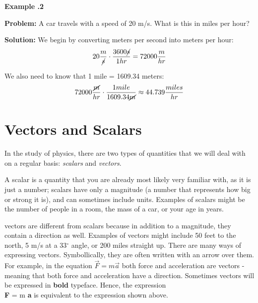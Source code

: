 	
\begin{mdframed}[backgroundcolor=blue!10!white]
	\begin{center}
		\textbf{Example \thesubsection.2}	\label{ex1132}
	\end{center}
	
	\vspace{0.1in}	
	\textbf{Problem:} A car travels with a speed of 20 m/s.  What is this in miles per hour? 
	\vspace{0.1in}
	
	\textbf{Solution:} We begin by converting meters per second into meters per hour:
	\begin{equation*}
	20 \frac{m}{\cancel{s}} \cdot \frac{3600 \cancel{s}}{1 {hr}} = 72000 \frac{m}{hr}
	\end{equation*}
	
	We also need to know that 1 mile = 1609.34 meters:
	\begin{equation*}
		72000 \frac{\cancel{m}}{hr} \cdot \frac{1 mile}{1609.34 \cancel{m}} \approx 44.739 \frac{miles}{hr} 
	\end{equation*}
	
	
\end{mdframed}
		


\section{Vectors and Scalars}
In the study of physics, there are two types of quantities that we will deal with on a regular basis: \textit{scalars} and \textit{vectors}.  

A \gls{scalar} is a quantity that you are already most likely very familiar with, as it is just a number; scalars have only a \gls{magnitude} (a number that represents how big or strong it is), and can sometimes include units.  Examples of scalars might be the number of people in a room, the mass of a car, or your age in years.  

\gls{vector}s are different from scalars because in addition to a magnitude, they contain a direction as well.  Examples of vectors might include 50 feet to the north, 5 m/s at a 33$^\circ$ angle, or 200 miles straight up.  
There are many ways of expressing vectors.  Symbollically, they are often written with an arrow over them.  For example, in the equation \color{blue} $\vec{F} = m \vec{a}$ \color{black}  both force and acceleration are vectors - meaning that both force and acceleration have a direction.  Sometimes vectors will be expressed in \textbf{bold} typeface.   Hence, the expression \\ \color{blue} \textbf{F} = m \textbf{a}  \color{black} is equivalent to the expression shown above.

